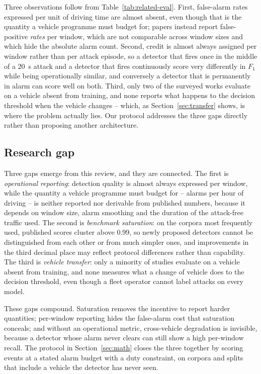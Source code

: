 \documentclass[preprint,11pt,authoryear]{elsarticle}
\begin{document}
Three observations follow from Table~\ref{tab:related-eval}. First, false-alarm rates expressed per
unit of driving time are almost absent, even though that is the quantity a vehicle programme must
budget for; papers instead report false-positive \emph{rates} per window, which are not comparable
across window sizes and which hide the absolute alarm count. Second, credit is almost always
assigned per window rather than per attack episode, so a detector that fires once in the middle of a
\SI{20}{\second} attack and a detector that fires continuously score very differently in $F_1$ while
being operationally similar, and conversely a detector that is permanently in alarm can score well
on both. Third, only two of the surveyed works evaluate on a vehicle absent from training, and none
reports what happens to the decision threshold when the vehicle changes -- which, as
Section~\ref{sec:transfer} shows, is where the problem actually lies. Our protocol addresses the
three gaps directly rather than proposing another architecture.

\subsection{Research gap}

Three gaps emerge from this review, and they are connected. The first is \emph{operational
reporting}: detection quality is almost always expressed per window, while the quantity a vehicle
programme must budget for -- alarms per hour of driving -- is neither reported nor derivable from
published numbers, because it depends on window size, alarm smoothing and the duration of the
attack-free traffic used. The second is \emph{benchmark saturation}: on the corpora most frequently
used, published scores cluster above 0.99, so newly proposed detectors cannot be distinguished from
each other or from much simpler ones, and improvements in the third decimal place may reflect
protocol differences rather than capability. The third is \emph{vehicle transfer}: only a minority of
studies evaluate on a vehicle absent from training, and none measures what a change of vehicle does
to the decision threshold, even though a fleet operator cannot label attacks on every model.

These gaps compound. Saturation removes the incentive to report harder quantities; per-window
reporting hides the false-alarm cost that saturation conceals; and without an operational metric,
cross-vehicle degradation is invisible, because a detector whose alarm never clears can still show
a high per-window recall. The protocol in Section~\ref{sec:math} closes the three together by
scoring events at a stated alarm budget with a duty constraint, on corpora and splits that include a
vehicle the detector has never seen.
\end{document}
